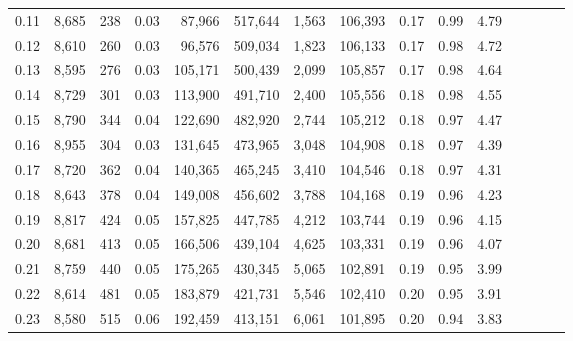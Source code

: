 \begin{tabular}{rrrcrrrrrrrrrrr}
0.11 &  8,685 &    238 &                                       0.03 &   87,966 &  517,644 &    1,563 &  106,393 &  0.17 &  0.99 &                         4.79 \\
0.12 &  8,610 &    260 &                                       0.03 &   96,576 &  509,034 &    1,823 &  106,133 &  0.17 &  0.98 &                         4.72 \\
0.13 &  8,595 &    276 &                                       0.03 &  105,171 &  500,439 &    2,099 &  105,857 &  0.17 &  0.98 &                         4.64 \\
0.14 &  8,729 &    301 &                                       0.03 &  113,900 &  491,710 &    2,400 &  105,556 &  0.18 &  0.98 &                         4.55 \\
0.15 &  8,790 &    344 &                                       0.04 &  122,690 &  482,920 &    2,744 &  105,212 &  0.18 &  0.97 &                         4.47 \\
0.16 &  8,955 &    304 &                                       0.03 &  131,645 &  473,965 &    3,048 &  104,908 &  0.18 &  0.97 &                         4.39 \\
0.17 &  8,720 &    362 &                                       0.04 &  140,365 &  465,245 &    3,410 &  104,546 &  0.18 &  0.97 &                         4.31 \\
0.18 &  8,643 &    378 &                                       0.04 &  149,008 &  456,602 &    3,788 &  104,168 &  0.19 &  0.96 &                         4.23 \\
0.19 &  8,817 &    424 &                                       0.05 &  157,825 &  447,785 &    4,212 &  103,744 &  0.19 &  0.96 &                         4.15 \\
0.20 &  8,681 &    413 &                                       0.05 &  166,506 &  439,104 &    4,625 &  103,331 &  0.19 &  0.96 &                         4.07 \\
0.21 &  8,759 &    440 &                                       0.05 &  175,265 &  430,345 &    5,065 &  102,891 &  0.19 &  0.95 &                         3.99 \\
0.22 &  8,614 &    481 &                                       0.05 &  183,879 &  421,731 &    5,546 &  102,410 &  0.20 &  0.95 &                         3.91 \\
0.23 &  8,580 &    515 &                                       0.06 &  192,459 &  413,151 &    6,061 &  101,895 &  0.20 &  0.94 &                         3.83 \\

\end{tabular}

